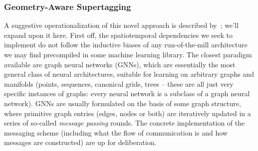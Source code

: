 \subsubsection{Geometry-Aware Supertagging}
\label{subsubsection:gas}
A suggestive operationalization of this novel approach is described by~\cite{kogkalidis2022geometryaware}; we'll expand upon it here.
First off, the spatiotemporal dependencies we seek to implement do not follow the inductive biases of any run-of-the-mill architecture we may find precompiled in some machine learning library.
The closest paradigm available are graph neural networks (GNNs), which are essentially the most general class of neural architectures, suitable for learning on arbitrary graphs and manifolds (points, sequences, canonical grids, trees -- these are all just very specific instances of graphs: every neural network is a subclass of a graph neural network).
GNNs are usually formulated on the basis of some graph structure, where primitive graph entries (edges, nodes or both) are iteratively updated in a series of so-called \textit{message passing} rounds.
The concrete implementation of the messaging scheme (including what the flow of communication is and how messages are constructed) are up for deliberation.

